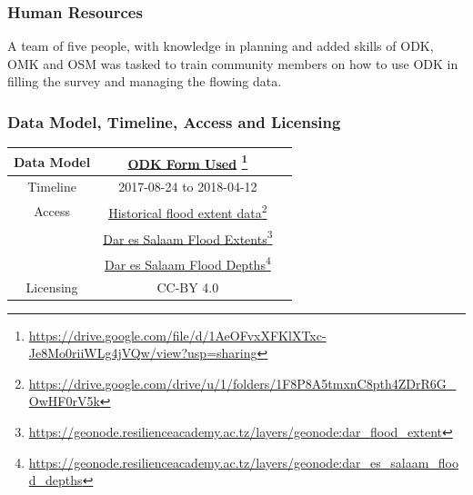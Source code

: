 \documentclass[a4paper,12pt,twoside]{article}
\begin{document}
\subsubsection{Human Resources}
A team of five people, with knowledge in planning and added skills of ODK, OMK and OSM was tasked to train community members on how to use ODK in filling the survey and managing the flowing data.

\subsubsection{Data Model, Timeline, Access and Licensing}
\begin{center}
\begin{tabular}{|c|c|c|}  
\hline
Data Model &  \href{https://drive.google.com/file/d/1AeOFvxXFKlXTxc-Je8Mo0riiWLg4jVQw/view?usp=sharing
}{ODK Form Used} \footnote{\url{https://drive.google.com/file/d/1AeOFvxXFKlXTxc-Je8Mo0riiWLg4jVQw/view?usp=sharing}} \\
 \hline
  Timeline  &  2017-08-24 to 2018-04-12 \\
\hline  
 Access  & 
    \href{https://drive.google.com/drive/u/1/folders/1F8P8A5tmxnC8pth4ZDrR6G_OwHF0rV5k}{Historical flood extent data}\footnote{\url{https://drive.google.com/drive/u/1/folders/1F8P8A5tmxnC8pth4ZDrR6G_OwHF0rV5k}}\\
{} & 
    \href{https://geonode.resilienceacademy.ac.tz/layers/geonode:dar_flood_extent}{Dar es Salaam Flood Extents}\footnote{\url{https://geonode.resilienceacademy.ac.tz/layers/geonode:dar_flood_extent}}\\
 {} &    
     \href{https://geonode.resilienceacademy.ac.tz/layers/geonode:dar_es_salaam_flood_depths}{Dar es Salaam Flood Depths}\footnote{\url{https://geonode.resilienceacademy.ac.tz/layers/geonode:dar_es_salaam_flood_depths}} \\
\hline
Licensing   &  CC-BY 4.0 \\
\hline
\end{tabular}
\end{center}
\end{document}
